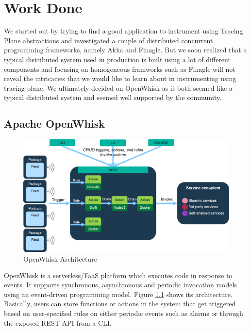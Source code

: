 \chapter{Work Done}
We started out by trying to find a good application to instrument using Tracing Plane abstractions and investigated a couple of distributed concurrent programming frameworks, namely Akka and Finagle. But we soon realized that a typical distributed system used in production is built using a lot of different components and focusing on homogeneous framworks such as Finagle will not reveal the intricacies that we would like to learn about in instrumenting using tracing plane. We ultimately decided on OpenWhisk as it both seemed like a typical distributed system and seemed well supported by the community.

\section{Apache OpenWhisk}
\begin{figure}[htb]
\centering
\includegraphics[scale=0.6]{./OpenWhisk}
\caption{OpenWhisk Architecture}
\label{fig:owarch}
\end{figure}
OpenWhisk is a serverless/FaaS platform which executes code in response to events. It supports synchronous, asynchronous and periodic invocation models using an event-driven programming model. Figure \ref{fig:owarch} shows its architecture. Basically, users can store functions or actions in the system that get triggered based on user-specified rules on either periodic events such as alarms or through the exposed REST API from a CLI.

